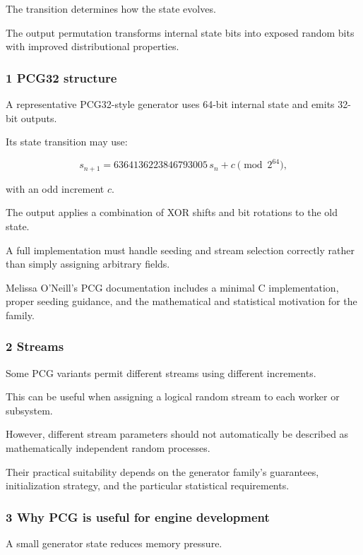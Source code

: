 The transition determines how the state evolves.

The output permutation transforms internal state bits into exposed random bits with improved distributional properties.

\subsubsection{1 PCG32 structure}\label{02-foundations-ii-ch029-pcg32-structure}

A representative PCG32-style generator uses 64-bit internal state and emits 32-bit outputs.

Its state transition may use:

\[
 s_{n+1} = 6364136223846793005\,s_n+c \pmod{2^{64}},
\]

with an odd increment \(c\).

The output applies a combination of XOR shifts and bit rotations to the old state.

A full implementation must handle seeding and stream selection correctly rather than simply assigning arbitrary fields.

Melissa O'Neill's PCG documentation includes a minimal C implementation, proper seeding guidance, and the mathematical and statistical motivation for the family.

\subsubsection{2 Streams}\label{02-foundations-ii-ch029-streams}

Some PCG variants permit different streams using different increments.

This can be useful when assigning a logical random stream to each worker or subsystem.

However, different stream parameters should not automatically be described as mathematically independent random processes.

Their practical suitability depends on the generator family's guarantees, initialization strategy, and the particular statistical requirements.

\subsubsection{3 Why PCG is useful for engine development}\label{02-foundations-ii-ch029-why-pcg-is-useful-for-engine-development}

A small generator state reduces memory pressure.

